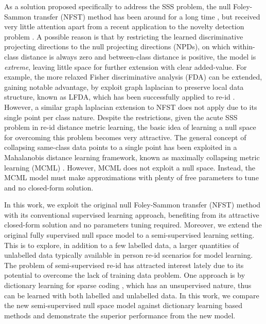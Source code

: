 \documentclass[10pt,twocolumn,letterpaper]{article}
\begin{document}

As a solution proposed specifically to address the SSS problem, the null Foley-Sammon transfer (NFST) method has been around for a long time \cite{guo2006null}, but received very little attention apart from a recent application to the novelty detection problem \cite{bodesheim2013kernel}. A possible reason is that by restricting the learned discriminative projecting directions to the null projecting directions (NPDs), on which within-class distance is always zero and between-class distance is positive, the model is {\em extreme}, leaving little space for further extension with clear added-value. For example, the more relaxed Fisher discriminative analysis (FDA) can be extended, gaining notable advantage, by exploit graph laplacian to preserve local data structure, known as LFDA\cite{sugiyama2006local}, which has been successfully applied to re-id \cite{pedagadi2013local}. However, a similar graph laplacian extension to NFST does not apply due to its single point per class nature. Despite the restrictions,  given the acute SSS problem in re-id distance metric learning, the basic idea of learning a null space for overcoming this problem becomes very attractive. The general concept of collapsing same-class data points to a single point has been exploited in a Mahalanobis distance learning framework, known as maximally collapsing metric learning (MCML) \cite{MCML_GlobersonR05}. However, MCML does not exploit a null space. Instead, the MCML model must make approximations with plenty of free parameters to tune and no
closed-form solution.






In this work, we exploit the original null Foley-Sammon transfer (NFST) method
\cite{guo2006null} with its conventional supervised
learning approach, benefiting from its attractive closed-form
solution and no parameters tuning required. Moreover, we extend the
original fully supervised null space model to a semi-supervised 
learning setting. This is to explore, in addition to a few labelled data, a larger
quantities of unlabelled data typically available in person re-id
scenarios for model learning. The problem of semi-supervised re-id has
attracted interest lately due to its potential to overcome the lack of
training data problem. One approach is by dictionary
learning for sparse coding \cite{liu2014semi,kodirovdictionary}, which
has an unsupervised nature, thus  can be learned with
both labelled and unlabelled data. In this work, we compare the new
semi-supervised null space model against dictionary learning based
methods and demonstrate the superior performance from the new model.
\end{document}

